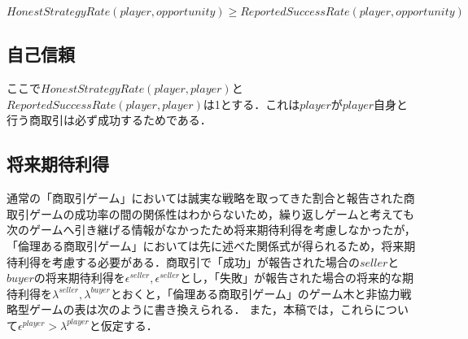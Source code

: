 \begin{equation}
  HonestStrategyRate(player, opportunity) \geq ReportedSuccessRate(player, opportunity)
\end{equation}

\subsection{自己信頼}
ここで$ HonestStrategyRate(player, player) $と$ ReportedSuccessRate(player, player) $は1とする．これは$ player $が$ player $自身と行う商取引は必ず成功するためである．

\subsection{将来期待利得}
通常の「商取引ゲーム」においては誠実な戦略を取ってきた割合と報告された商取引ゲームの成功率の間の関係性はわからないため，繰り返しゲームと考えても次のゲームへ引き継げる情報がなかったため将来期待利得を考慮しなかったが，「倫理ある商取引ゲーム」においては先に述べた関係式が得られるため，将来期待利得を考慮する必要がある．商取引で「成功」が報告された場合の$ seller $と$ buyer $の将来期待利得を$ \epsilon^{seller}, \epsilon^{seller} $とし，「失敗」が報告された場合の将来的な期待利得を$ \lambda^{seller}, \lambda^{buyer} $とおくと，「倫理ある商取引ゲーム」のゲーム木と非協力戦略型ゲームの表は次のように書き換えられる．
また，本稿では，これらについて$ \epsilon^{player} > \lambda^{player} $と仮定する．
